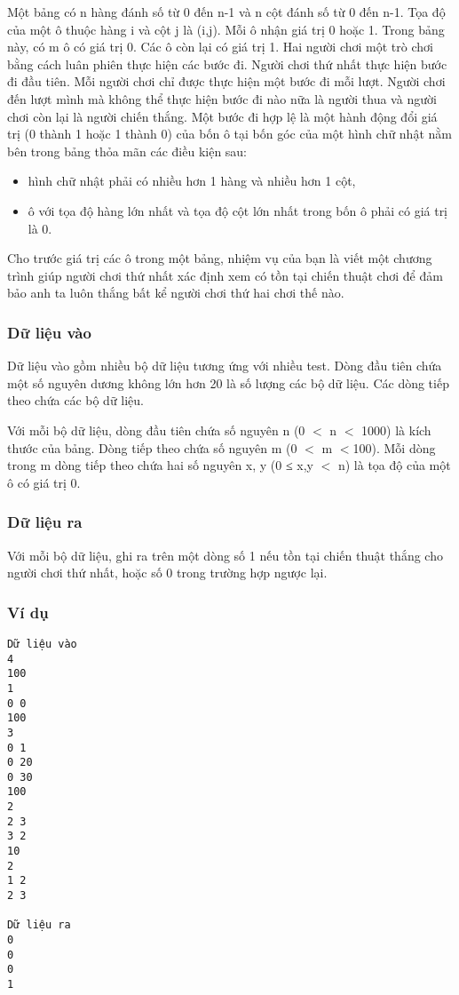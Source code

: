 



   Một bảng có n hàng đánh số từ 0 đến n-1 và n cột đánh số từ 0 đến n-1. Tọa độ của một ô thuộc hàng i và cột  j là (i,j). Mỗi ô nhận giá trị 0 hoặc 1. Trong bảng này, có m ô có giá trị 0. Các ô còn lại có giá trị 1. Hai người chơi một trò chơi bằng cách luân phiên thực hiện các bước đi. Người chơi thứ nhất thực hiện bước đi đầu tiên. Mỗi người chơi chỉ được thực hiện một bước đi mỗi lượt. Người chơi đến lượt mình mà không thể thực hiện bước đi nào nữa là người thua và người chơi còn lại là người chiến thắng. Một bước đi hợp lệ là một hành động đổi giá trị (0 thành 1 hoặc 1 thành 0) của bốn ô tại bốn góc của một hình chữ nhật nằm bên trong bảng thỏa mãn các điều kiện sau:  
\begin{itemize}
	\item     hình chữ nhật phải có nhiều hơn 1 hàng và nhiều hơn 1 cột,   
	\item     ô với tọa độ hàng lớn nhất và tọa độ cột lớn nhất trong bốn ô phải có giá trị là 0.   
\end{itemize}

   Cho trước giá trị các ô trong một bảng, nhiệm vụ của bạn là viết một chương trình giúp người chơi thứ nhất xác định xem có tồn tại chiến thuật chơi để đảm bảo anh ta luôn thắng bất kể người chơi thứ hai chơi thế nào.  

\subsubsection{   Dữ liệu vào  }

   Dữ liệu vào gồm nhiều bộ dữ liệu tương ứng với nhiều test. Dòng đầu tiên chứa một số nguyên dương không lớn hơn 20 là số lượng các bộ dữ liệu. Các dòng tiếp theo chứa các bộ dữ liệu.  

   Với mỗi bộ dữ liệu, dòng đầu tiên chứa số nguyên n (0 $<$ n $<$ 1000) là kích thước của bảng. Dòng tiếp theo chứa số nguyên m (0 $<$ m $<$100). Mỗi dòng trong m dòng tiếp theo chứa hai số nguyên x, y (0 ≤ x,y $<$ n)  là tọa độ của một ô có giá trị 0.  

\subsubsection{   Dữ liệu ra  }

   Với mỗi bộ dữ liệu, ghi ra trên một dòng số 1 nếu tồn tại chiến thuật thắng cho người chơi thứ nhất, hoặc số 0 trong trường hợp ngược lại.  

\subsubsection{   Ví dụ  }
\begin{verbatim}
Dữ liệu vào
4
100
1
0 0 
100
3
0 1
0 20
0 30 
100
2
2 3
3 2
10
2
1 2 
2 3	

Dữ liệu ra
0
0
0
1
\end{verbatim}